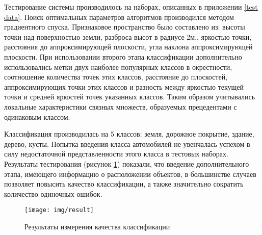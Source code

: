 Тестирование системы производилось на наборах, описанных в приложении \ref{test data}. Поиск оптимальных параметров алгоритмов производился методом градиентного спуска. Признаковое пространство было составлено из: высоты точки над поверхностью земли, разброса высот в радиусе 2м., яркостью точки, расстояния до аппроксимирующей плоскости, угла наклона аппроксимирующей плоскости. При использовании второго этапа классификации дополнительно использовались метки двух наиболее популярных классов в окрестности, соотношение количества точек этих классов, расстояние до плоскостей, аппроксимирующих точки этих классов и разность между яркостью текущей точки и средней яркостей точек указанных классов. Таким образом учитывались локальные характеристики связных множеств, образуемых прецедентами с одинаковым классом.

Классификация производилась на 5 классов: земля, дорожное покрытие, здание, дерево, кусты. Попытка введения класса автомобилей не увенчалась успехом в силу недостаточной представленности этого класса в тестовых наборах. Результаты тестирования (рисунок \ref{results}) показали, что введение дополнительного этапа, имеющего информацию о расположении объектов, в большинстве случаев позволяет повысить качество классификации, а также значительно сократить количество одиночных ошибок.

\begin{figure}[h]
\centering
\texttt{[image: img/result]}
\caption{Результаты измерения качества классификации}
\label{results}
\end{figure}